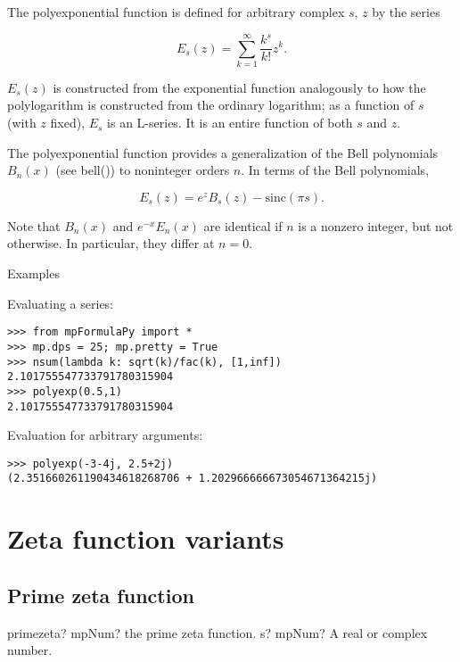 \vpara
The polyexponential function is defined for arbitrary complex $s$, $z$ by the series

\begin{equation}
E_s(z) = \sum_{k=1}^{\infty} \frac{k^s}{k!} z^k.
\end{equation}

$E_s(z)$ is constructed from the exponential function analogously to how the polylogarithm is constructed from the ordinary logarithm; as a function of $s$ (with $z$ fixed), $E_s$ is an L-series. It is an entire function of both $s$ and $z$.

The polyexponential function provides a generalization of the Bell polynomials $B_n(x)$ (see bell()) to noninteger orders $n$. In terms of the Bell polynomials,

\begin{equation}
E_s(z) = e^z B_s(z) - \text{sinc}(\pi s).
\end{equation}

Note that $B_n(x)$ and $e^{-x} E_n(x)$ are identical if $n$ is a nonzero integer, but not otherwise. In particular, they differ at $n=0$.

Examples

Evaluating a series:

\begin{lstlisting}
>>> from mpFormulaPy import *
>>> mp.dps = 25; mp.pretty = True
>>> nsum(lambda k: sqrt(k)/fac(k), [1,inf])
2.101755547733791780315904
>>> polyexp(0.5,1)
2.101755547733791780315904
\end{lstlisting}

Evaluation for arbitrary arguments:

\begin{lstlisting}
>>> polyexp(-3-4j, 2.5+2j)
(2.351660261190434618268706 + 1.202966666673054671364215j)
\end{lstlisting}


\newpage
\section{Zeta function variants}

\subsection{Prime zeta function}

\begin{mpFunctionsExtract}
	\mpFunctionOne
	{primezeta? mpNum? the prime zeta function.}
	{s? mpNum? A real or complex number.}
\end{mpFunctionsExtract}


